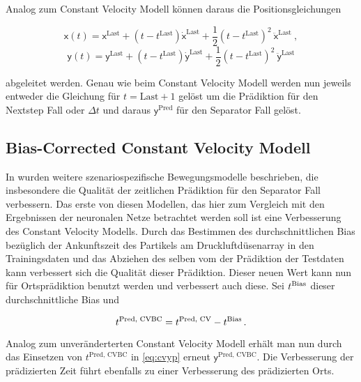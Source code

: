 Analog zum Constant Velocity Modell können daraus die Positionsgleichungen 

\begin{equation*}
    \mathsf{x}(t) = \mathsf{x}^{\text{Last}} + (t - t^{\text{Last}})\dot{\mathsf{x}}^{\text{Last}} 
    + \frac{1}{2} (t - t^{\text{Last}})^2 \: \ddot{\mathsf{x}}^{\text{Last}} \: , 
\end{equation*}
\begin{equation*}
    \mathsf{y}(t) = \mathsf{y}^{\text{Last}} + (t - t^{\text{Last}})\dot{\mathsf{y}}^{\text{Last}}
    + \frac{1}{2} (t - t^{\text{Last}})^2 \: \ddot{\mathsf{y}}^{\text{Last}}
\end{equation*}

abgeleitet werden.
Genau wie beim Constant Velocity Modell werden nun jeweils entweder die Gleichung für \(t = \text{Last} + 1\) gelöst 
um die Prädiktion für den Nextstep Fall oder \(\Delta t \) und daraus \(\mathsf{y}^{\text{Pred}}\) für den Separator Fall gelöst.


\subsection{Bias-Corrected Constant Velocity Modell}

In \cite{Pfaff2018} wurden weitere szenariospezifische Bewegungsmodelle beschrieben, die insbesondere die Qualität der zeitlichen Prädiktion für den Separator Fall verbessern.
Das erste von diesen Modellen, das hier zum Vergleich mit den Ergebnissen der neuronalen Netze betrachtet werden soll ist eine Verbesserung des Constant Velocity Modells.
Durch das Bestimmen des durchschnittlichen Bias bezüglich der Ankunftszeit des Partikels am Druckluftdüsenarray in den Trainingsdaten und das Abziehen des selben vom der Prädiktion der Testdaten kann verbessert sich die Qualität dieser Prädiktion.
Dieser neuen Wert kann nun für Ortsprädiktion benutzt werden und verbessert auch diese.
Sei \(t{^{\text{Bias}}}\) dieser durchschnittliche Bias und

\begin{equation*}
    t{^{\text{Pred, CVBC}}} = t{^{\text{Pred, CV}}} - t{^{\text{Bias}}} \, .
\end{equation*}

Analog zum unveränderterten Constant Velocity Modell erhält man nun durch das Einsetzen von \(t^{\text{Pred, CVBC}}\) in \eqref{eq:cvyp} erneut \(\mathsf{y}^{\text{Pred, CVBC}}\).
Die Verbesserung der prädizierten Zeit führt ebenfalls zu einer Verbesserung des prädizierten Orts.


